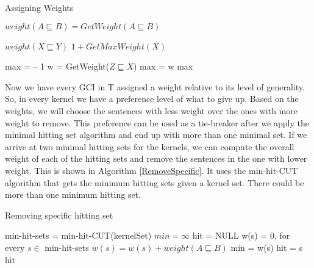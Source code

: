 \begin{algorithm}
\caption{Assigning Weights}
\label{AssignWeights}
\begin{algorithmic}[1]
\State $weight(A \sqsubseteq B) = GetWeight(A \sqsubseteq B)$
\EndFor
\EndFunction
\end{algorithmic}

\begin{algorithmic}[1]
\State
\Return $weight(X \sqsubseteq Y)$
\EndIf
{}
\State
{}
\Else
\State
\Return $1 + GetMaxWeight(X)$
\EndIf
\EndFunction
\end{algorithmic}

\begin{algorithmic}[1]
\State max = -- 1
\State w = GetWeight($Z \sqsubseteq X$)
\State max = w
\EndIf
\EndFor
\State
\Return max
\EndFunction
\end{algorithmic}
\end{algorithm}

Now we have every GCI in T assigned a weight relative to its level of generality. So, in every kernel we have a preference level of what to give up. Based on the weights, we will choose the sentences with less weight over the ones with more weight to remove. This preference can be used as a tie-breaker after we apply the minimal hitting set algorithm and end up with more than one minimal set. If we arrive at two minimal hitting sets for the kernels, we can compute the overall weight of each of the hitting sets and remove the sentences in the one with lower weight. This is shown in Algorithm \ref{RemoveSpecific}. It uses the min-hit-CUT algorithm that gets the minimum hitting sets given a kernel set. There could be more than one minimum hitting set.

\begin{algorithm}
\caption{Removing specific hitting set}
\label{RemoveSpecific}
\begin{algorithmic}[1]
\State min-hit-sets = min-hit-CUT(kernelSet)
\State $min = \infty$
\State hit = NULL
\State w(s) = 0, for every $s \in $ min-hit-sets
\State $w(s) = w(s) + weight(A \sqsubseteq B)$
\EndFor
{}
\State min = w(s)
\State hit = s
\EndIf
\EndFor
\State
\Return hit
\EndFunction
\end{algorithmic}
\end{algorithm}

